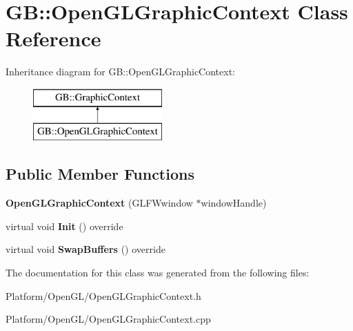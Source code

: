 \hypertarget{class_g_b_1_1_open_g_l_graphic_context}{}\section{GB\+::Open\+G\+L\+Graphic\+Context Class Reference}
\label{class_g_b_1_1_open_g_l_graphic_context}
Inheritance diagram for GB\+::Open\+G\+L\+Graphic\+Context\+:\begin{figure}[H]
\begin{center}
\leavevmode
\includegraphics[height=2.000000cm]{class_g_b_1_1_open_g_l_graphic_context}
\end{center}
\end{figure}
\subsection*{Public Member Functions}
\begin{DoxyCompactItemize}
\item 
\mbox{\label{class_g_b_1_1_open_g_l_graphic_context_a04098c997c931f03a834d8c7c45ac34e}} 
{\bfseries Open\+G\+L\+Graphic\+Context} (G\+L\+F\+Wwindow $\ast$window\+Handle)
\item 
\mbox{\label{class_g_b_1_1_open_g_l_graphic_context_a2089944bad7ebafd2e9bd0102404e52d}} 
virtual void {\bfseries Init} () override
\item 
\mbox{\label{class_g_b_1_1_open_g_l_graphic_context_a21abfe128dcf3a87663a3282c7474002}} 
virtual void {\bfseries Swap\+Buffers} () override
\end{DoxyCompactItemize}


The documentation for this class was generated from the following files\+:\begin{DoxyCompactItemize}
\item 
Platform/\+Open\+G\+L/Open\+G\+L\+Graphic\+Context.\+h\item 
Platform/\+Open\+G\+L/Open\+G\+L\+Graphic\+Context.\+cpp\end{DoxyCompactItemize}
